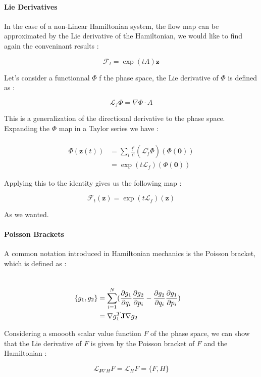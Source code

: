 \documentclass[ansiapaper]{report}
\begin{document}
\begin{multicols}{3}
  \paragraph*{Lie Derivatives}

  In the case of a non-Linear Hamiltonian system, the flow map can be approximated by the Lie derivative of the Hamiltonian, we would like to find again the conveninant results :

  $$ \mathcal{F}_t = \exp(tA)\textbf{z}$$

  Let's consider a functionnal $\Phi$ f the phase space, the Lie derivative of $\Phi$ is defined as :

  $$ \mathcal{L}_f \Phi = \nabla \Phi \cdot A$$

  This is a generalization of the directional derivative to the phase space. Expanding the $\Phi$ map in a Taylor series we have :

  \begin{align*}
    \\ \Phi(\textbf{z}(t)) &= \sum_i \frac{t^i}{i!}(\mathcal{L}_f^i \Phi)( \Phi(\textbf{0} ))
    \\ &= \exp(t\mathcal{L}_f)(\Phi(\textbf{0}) )
  \end{align*}

  Applying this to the identity gives us the following map :

  $$\mathcal{F}_t(\textbf{z} ) = \exp(t\mathcal{L}_f)(\textbf{z})$$

  As we wanted.

  \paragraph*{Poisson Brackets}

  A common notation introduced in Hamiltonian mechanics is the Poisson bracket, which is defined as :

  \begin{align*}
    \\ \{g_1, g_2 \} &= \sum_{i = 1}^N (\pdv{g_1}{q_i}\pdv{g_2}{p_i} - \pdv{g_2}{q_i}\pdv{g_1}{p_i})
    \\ &= \nabla g_1^T \textbf{J} \nabla g_2
  \end{align*}

  Considering a smoooth scalar value function $F$ of the phase space, we can show that the Lie derivative of $F$ is given by the Poisson bracket of $F$ and the Hamiltonian :

  $$ \mathcal{L}_{\textbf{J} \nabla H} F = \mathcal{L}_H F = \{F, H\}$$


\end{multicols}
\end{document}
